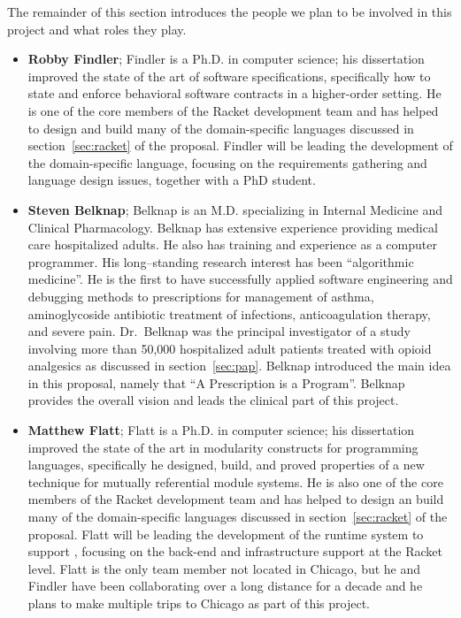 \documentclass[11pt]{article}
\begin{document}
The remainder of this section introduces the people we plan to be
involved in this project and what roles they play.

\begin{itemize}
\item\textbf{Robby Findler}; Findler is a Ph.D. in computer science;
  his dissertation improved the state of the art of software
  specifications, specifically how to state and enforce behavioral
  software contracts in a higher-order setting. He is one of the core
  members of the Racket development team and has helped to design and
  build many of the domain-specific languages discussed in
  section~\ref{sec:racket} of the proposal. Findler will be leading
  the development of the domain-specific language, focusing on the
  requirements gathering and language design issues, together with a
  PhD student.

\item\textbf{Steven Belknap}; Belknap is an M.D. specializing in
  Internal Medicine and Clinical Pharmacology. Belknap has extensive
  experience providing medical care hospitalized adults.  He also has
  training and experience as a computer programmer. His long–standing
  research interest has been ``algorithmic medicine''.  He is the
  first to have successfully applied software engineering and
  debugging methods to prescriptions for management of asthma,
  aminoglycoside antibiotic treatment of infections, anticoagulation
  therapy, and severe pain. Dr.\ Belknap was the principal
  investigator of a study involving more than 50,000 hospitalized
  adult patients treated with opioid analgesics as discussed in
  section~\ref{sec:pap}. Belknap introduced the main idea in this
  proposal, namely that ``A Prescription is a Program''. Belknap
  provides the overall vision and leads the clinical part of this
  project.

\item\textbf{Matthew Flatt}; Flatt is a Ph.D. in computer science; his
  dissertation improved the state of the art in modularity constructs
  for programming languages, specifically he designed, build, and
  proved properties of a new technique for mutually referential module
  systems. He is also one of the core members of the Racket
  development team and has helped to design an build many of the
  domain-specific languages discussed in section~\ref{sec:racket} of
  the proposal. Flatt will be leading the development of the runtime
  system to support \poppl{}, focusing on the back-end and
  infrastructure support at the Racket level. Flatt is the only team
  member not located in Chicago, but he and Findler have been
  collaborating over a long distance for a decade and he plans to make
  multiple trips to Chicago as part of this project.


\end{itemize}
\end{document}
